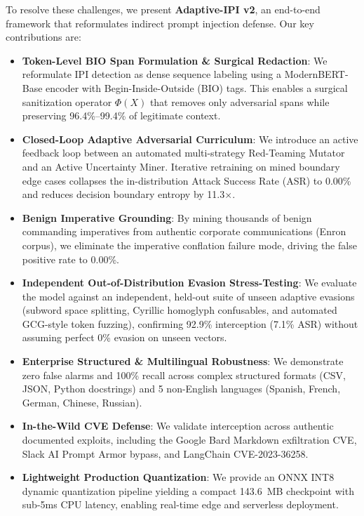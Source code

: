 \documentclass[conference]{IEEEtran}
\begin{document}
To resolve these challenges, we present \textbf{Adaptive-IPI v2}, an end-to-end framework that reformulates indirect prompt injection defense. Our key contributions are:
\begin{itemize}
    \item \textbf{Token-Level BIO Span Formulation \& Surgical Redaction}: We reformulate IPI detection as dense sequence labeling using a ModernBERT-Base encoder with Begin-Inside-Outside (BIO) tags. This enables a surgical sanitization operator $\Phi(X)$ that removes only adversarial spans while preserving 96.4\%--99.4\% of legitimate context.
    \item \textbf{Closed-Loop Adaptive Adversarial Curriculum}: We introduce an active feedback loop between an automated multi-strategy Red-Teaming Mutator and an Active Uncertainty Miner. Iterative retraining on mined boundary edge cases collapses the in-distribution Attack Success Rate (ASR) to 0.00\% and reduces decision boundary entropy by 11.3$\times$.
    \item \textbf{Benign Imperative Grounding}: By mining thousands of benign commanding imperatives from authentic corporate communications (Enron corpus), we eliminate the imperative conflation failure mode, driving the false positive rate to 0.00\%.
    \item \textbf{Independent Out-of-Distribution Evasion Stress-Testing}: We evaluate the model against an independent, held-out suite of unseen adaptive evasions (subword space splitting, Cyrillic homoglyph confusables, and automated GCG-style token fuzzing), confirming 92.9\% interception (7.1\% ASR) without assuming perfect 0\% evasion on unseen vectors.
    \item \textbf{Enterprise Structured \& Multilingual Robustness}: We demonstrate zero false alarms and 100\% recall across complex structured formats (CSV, JSON, Python docstrings) and 5 non-English languages (Spanish, French, German, Chinese, Russian).
    \item \textbf{In-the-Wild CVE Defense}: We validate interception across authentic documented exploits, including the Google Bard Markdown exfiltration CVE, Slack AI Prompt Armor bypass, and LangChain CVE-2023-36258.
    \item \textbf{Lightweight Production Quantization}: We provide an ONNX INT8 dynamic quantization pipeline yielding a compact 143.6~MB checkpoint with sub-5ms CPU latency, enabling real-time edge and serverless deployment.
\end{itemize}
\end{document}
